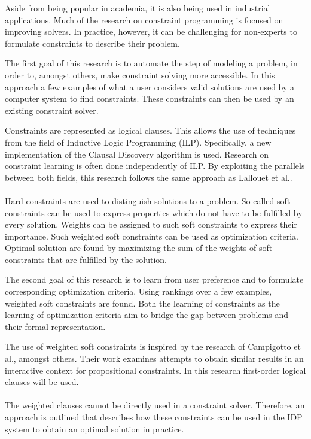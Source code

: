 \documentclass{llncs}
\begin{document}
Aside from being popular in academia, it is also being used in industrial applications\cite{Simonis:IndustrialApplicationsCP}.
Much of the research on constraint programming is focused on improving solvers.
In practice, however, it can be challenging for non-experts to formulate constraints to describe their problem\cite{Wallace:PrinciplesCP}.

The first goal of this research is to automate the step of modeling a problem, in order to, amongst others, make constraint solving more accessible.
In this approach a few examples of what a user considers valid solutions are used by a computer system to find constraints.
These constraints can then be used by an existing constraint solver.

Constraints are represented as logical clauses.
This allows the use of techniques from the field of Inductive Logic Programming (ILP).
Specifically, a new implementation of the Clausal Discovery algorithm\cite{DeRaedt:ClausalDiscovery} is used.
Research on constraint learning is often done independently of ILP.
By exploiting the parallels between both fields, this research follows the same approach as Lallouet et al.\cite{Lallouet:LearningCP}.
\\\\
Hard constraints are used to distinguish solutions to a problem.
So called soft constraints can be used to express properties which do not have to be fulfilled by every solution.
Weights can be assigned to such soft constraints to express their importance.
Such weighted soft constraints can be used as optimization criteria.
Optimal solution are found by maximizing the sum of the weights of soft constraints that are fulfilled by the solution.

The second goal of this research is to learn from user preference and to formulate corresponding optimization criteria.
Using rankings over a few examples, weighted soft constraints are found.
Both the learning of constraints as the learning of optimization criteria aim to bridge the gap between problems and their formal representation.

The use of weighted soft constraints is inspired by the research of Campigotto et al.\cite{campigotto2011active}, amongst others.
Their work examines attempts to obtain similar results in an interactive context for propositional constraints.
In this research first-order logical clauses will be used.
\\\\
The weighted clauses cannot be directly used in a constraint solver.
Therefore, an approach is outlined that describes how these constraints can be used in the IDP system to obtain an optimal solution in practice.
\end{document}

